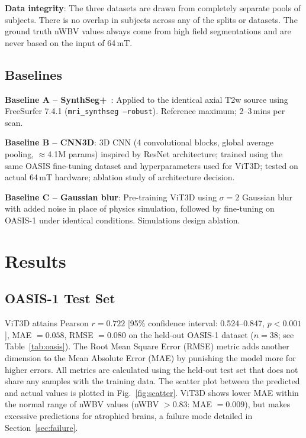 \documentclass{ieeeaccess}
\begin{document}
\textbf{Data integrity}: The three datasets are drawn from completely separate
pools of subjects. There is no overlap in subjects across any of the splits or
datasets. The ground truth nWBV values always come from high field
segmentations and are never based on the input of 64\,mT.

\subsection{Baselines}

\textbf{Baseline A -- SynthSeg+}~\cite{billot2023synthseg}: Applied to the
identical axial T2w source using FreeSurfer 7.4.1
(\texttt{mri\_synthseg --robust}). Reference maximum; 2--3\,mins per scan.

\textbf{Baseline B -- CNN3D}: 3D CNN (4 convolutional blocks, global average
pooling, $\approx$4.1M params) inspired by ResNet architecture; trained using
the same OASIS fine-tuning dataset and hyperparameters used for ViT3D; tested
on actual 64\,mT hardware; ablation study of architecture decision.

\textbf{Baseline C -- Gaussian blur}: Pre-training ViT3D using $\sigma = 2$
Gaussian blur with added noise in place of physics simulation, followed by
fine-tuning on OASIS-1 under identical conditions. Simulations design
ablation.

\section{Results}
\label{sec:results}

\subsection{OASIS-1 Test Set}

ViT3D attains Pearson $r = 0.722$ [95\% confidence interval: 0.524--0.847,
$p < 0.001$], MAE $= 0.058$, RMSE $= 0.080$ on the held-out OASIS-1 dataset
($n = 38$; see Table~\ref{tab:oasis}). The Root Mean Square Error (RMSE)
metric adds another dimension to the Mean Absolute Error (MAE) by punishing
the model more for higher errors. All metrics are calculated using the
held-out test set that does not share any samples with the training data. The
scatter plot between the predicted and actual values is plotted in
Fig.~\ref{fig:scatter}. ViT3D shows lower MAE within the normal
range of nWBV values (nWBV $> 0.83$: MAE $= 0.009$), but makes excessive
predictions for atrophied brains, a failure mode detailed in
Section~\ref{sec:failure}.
\end{document}
